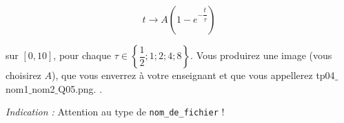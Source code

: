 \begin{equation*}
  t \to A\left(1-e^{-\dfrac{t}{\tau}}\right)
\end{equation*}


sur $[0,10]$, pour chaque $\tau\in\left\{\dfrac{1}{2};1;2;4;8\right\}$. 
Vous produirez une image (vous choisirez $A$), que vous enverrez à votre enseignant et que vous appellerez tp04$\_$nom1$\_$nom2$\_$Q05.png. . 

\emph{Indication :} Attention au type de \texttt{nom\_de\_fichier} !